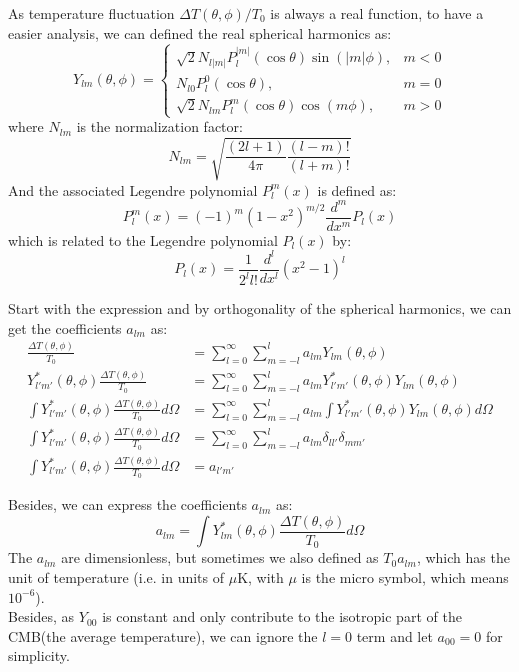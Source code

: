 \begin{theory}
    As temperature fluctuation $\Delta T(\theta, \phi)/T_0$ is always a real function, to have a easier analysis, we can defined the real spherical harmonics as:
    \[
        Y_{lm}(\theta, \phi) = \begin{cases}
            \sqrt{2} N_{l|m|} P_l^{|m|}(\cos \theta) \sin(|m| \phi), & m < 0 \\
            N_{l0} P_l^0(\cos \theta), & m = 0 \\
            \sqrt{2} N_{lm} P_l^m(\cos \theta) \cos(m \phi), & m > 0
        \end{cases}
    \] 
    where $N_{lm}$ is the normalization factor:
    \[
        N_{lm} = \sqrt{\frac{(2l + 1)}{4\pi} \frac{(l - m)!}{(l + m)!}}
    \]
    And the associated Legendre polynomial $P_l^m(x)$ is defined as:
    \[
        P_l^m(x) = (-1)^m (1 - x^2)^{m/2} \frac{d^m}{dx^m} P_l(x)
    \]
    which is related to the Legendre polynomial $P_l(x)$ by:
    \[
        P_l(x) = \frac{1}{2^l l!} \frac{d^l}{dx^l} (x^2 - 1)^l
    \] 
\end{theory}

\bigskip \noindent
\begin{foundation}
    Start with the expression and by orthogonality of the spherical harmonics, we can get the coefficients $a_{lm}$ as:
    \begin{align*}
        \frac{\Delta T(\theta, \phi)}{T_0} &= \sum_{l=0}^{\infty} \sum_{m=-l}^{l} a_{lm} Y_{lm}(\theta, \phi) \\
        Y_{l'm'}^*(\theta, \phi) \frac{\Delta T(\theta, \phi)}{T_0} &= \sum_{l=0}^{\infty} \sum_{m=-l}^{l} a_{lm} Y_{l'm'}^*(\theta, \phi) Y_{lm}(\theta, \phi) \\
        \int Y_{l'm'}^*(\theta, \phi) \frac{\Delta T(\theta, \phi)}{T_0} d\Omega &= \sum_{l=0}^{\infty} \sum_{m=-l}^{l} a_{lm} \int Y_{l'm'}^*(\theta, \phi) Y_{lm}(\theta, \phi) d\Omega \\
        \int Y_{l'm'}^*(\theta, \phi) \frac{\Delta T(\theta, \phi)}{T_0} d\Omega &= \sum_{l=0}^{\infty} \sum_{m=-l}^{l} a_{lm} \delta_{ll'} \delta_{mm'} \\
        \int Y_{l'm'}^*(\theta, \phi) \frac{\Delta T(\theta, \phi)}{T_0} d\Omega &= a_{l'm'}
    \end{align*}
\end{foundation}

\begin{theory}
    Besides, we can express the coefficients $a_{lm}$ as:
    \[
        a_{lm} = \int Y_{lm}^*(\theta, \phi) \frac{\Delta T(\theta, \phi)}{T_0} d\Omega
    \]
    The $a_{lm}$ are dimensionless, but sometimes we also defined as $T_0 a_{lm}$, which has the unit of temperature (i.e. in units of $\mu$K, with $\mu$ is the micro symbol, which means $10^{-6}$). \\

    Besides, as $Y_{00}$ is constant and only contribute to the isotropic part of the CMB(the average temperature), we can ignore the $l = 0$ term and let $a_{00} = 0$ for simplicity.
\end{theory}



